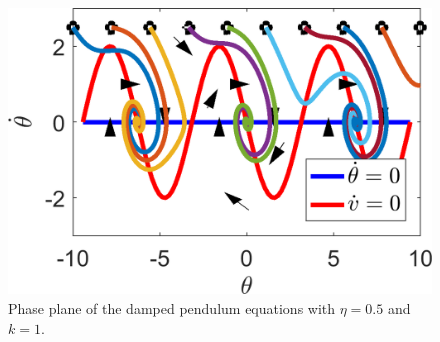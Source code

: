 \documentclass[]{article}
\newcommand{\tbo}{.6\textwidth}
\begin{document}
\begin{Answ}
\subsubsection{}
\begin{figure}[h!!!tb]
\centering
\includegraphics[width=\tbo]{../../Pictures/Damped_Pendulum_phase_plane.png}
\caption{Phase plane of the damped pendulum equations with $\eta=0.5$ and $k=1$.\label{Damped_fig}}
\end{figure}
\end{Answ}
\end{document}
